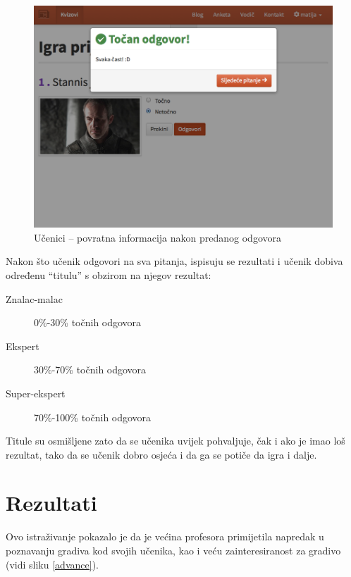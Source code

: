 \documentclass{scrreprt}
\begin{document}
\begin{figure}[H]
  \includegraphics[width=\textwidth, clip=true, trim=0 7cm 0 0, fbox]{student/boolean_question_correct}
  \caption{Učenici -- povratna informacija nakon predanog odgovora}
\end{figure}

Nakon što učenik odgovori na sva pitanja, ispisuju se rezultati i učenik dobiva
određenu ``titulu'' s obzirom na njegov rezultat:

\begin{description}
  \item[Znalac-malac] 0\%-30\% točnih odgovora
  \item[Ekspert] 30\%-70\% točnih odgovora
  \item[Super-ekspert] 70\%-100\% točnih odgovora
\end{description}

Titule su osmišljene zato da se učenika uvijek pohvaljuje, čak i ako je imao loš
rezultat, tako da se učenik dobro osjeća i da ga se potiče da igra i dalje.

\chapter{Rezultati}

Ovo istraživanje pokazalo je da je većina profesora primijetila napredak u
poznavanju gradiva kod svojih učenika, kao i veću zainteresiranost za gradivo
(vidi sliku \ref{advance}).
\end{document}
